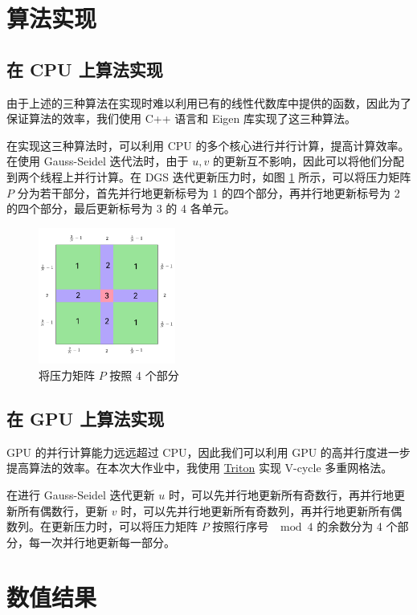 \documentclass{article}
\begin{document}
\section{算法实现}

\subsection{在 CPU 上算法实现}

由于上述的三种算法在实现时难以利用已有的线性代数库中提供的函数，因此为了保证算法的效率，我们使用 C++ 语言和 Eigen 库实现了这三种算法。

在实现这三种算法时，可以利用 CPU 的多个核心进行并行计算，提高计算效率。在使用 Gauss-Seidel 迭代法时，由于 $u,v$ 的更新互不影响，因此可以将他们分配到两个线程上并行计算。在 DGS 迭代更新压力时，如图 \ref{fig:split} 所示，可以将压力矩阵 $P$ 分为若干部分，首先并行地更新标号为 1 的四个部分，再并行地更新标号为 2 的四个部分，最后更新标号为 3 的 4 各单元。

\begin{figure}
    \centering
    \includegraphics[width=0.4\textwidth]{fig/split.pdf}
    \caption{将压力矩阵 $P$ 按照 4 个部分}
    \label{fig:split}
\end{figure}

\subsection{在 GPU 上算法实现}

GPU 的并行计算能力远远超过 CPU，因此我们可以利用 GPU 的高并行度进一步提高算法的效率。在本次大作业中，我使用 \href{https://triton-lang.org/main/index.html}{Triton} 实现 V-cycle 多重网格法。

在进行 Gauss-Seidel 迭代更新 $u$ 时，可以先并行地更新所有奇数行，再并行地更新所有偶数行，更新 $v$ 时，可以先并行地更新所有奇数列，再并行地更新所有偶数列。在更新压力时，可以将压力矩阵 $P$ 按照行序号 $\mod 4$ 的余数分为 4 个部分，每一次并行地更新每一部分。

\section{数值结果}
\end{document}

